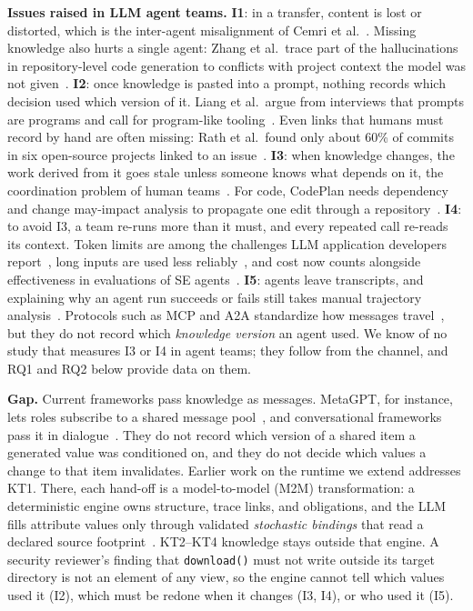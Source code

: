 \documentclass[10pt,conference]{IEEEtran}
\theoremstyle{definition}
\newcommand{\code}[1]{\texttt{#1}}
\begin{document}
\smallskip\noindent\textbf{Issues raised in LLM agent teams.} \textbf{I1}: in a transfer, content is lost
or distorted, which is the inter-agent misalignment of Cemri et al.~\cite{cemri2025mast}. Missing knowledge
also hurts a single agent: Zhang et al.\ trace part of the hallucinations in repository-level code
generation to conflicts with project context the model was not given~\cite{zhang2025hallucination}.
\textbf{I2}: once knowledge is pasted into a prompt, nothing records which decision used which version of
it. Liang et al.\ argue from interviews that prompts are programs and call for program-like
tooling~\cite{liang2025prompts}. Even links that humans must record by hand are often missing: Rath et al.\
found only about 60\% of commits in six open-source projects linked to an issue~\cite{rath2018traceability}.
\textbf{I3}: when knowledge changes, the work derived from it goes stale unless someone knows what depends on
it, the coordination problem of human teams~\cite{desouza2008dependencies,cataldo2013coordination}. For code,
CodePlan needs dependency and change may-impact analysis to propagate one edit through a
repository~\cite{bairi2024codeplan}. \textbf{I4}: to avoid I3, a team re-runs more than it must, and every
repeated call re-reads its context. Token limits are among the challenges LLM application developers
report~\cite{chen2025llmdevchallenges}, long inputs are used less reliably~\cite{liu2024lost}, and cost now
counts alongside effectiveness in evaluations of SE agents~\cite{xia2025agentless}. \textbf{I5}: agents
leave transcripts, and explaining why an agent run succeeds or fails still takes manual trajectory
analysis~\cite{bouzenia2025trajectories}. Protocols such as MCP and A2A standardize how messages
travel~\cite{mcp2024,a2a2025,ehtesham2025interop}, but they do not record which \emph{knowledge version} an
agent used. We know of no study that measures I3 or I4 in agent teams; they follow from the channel, and
RQ1 and RQ2 below provide data on them.

\smallskip\noindent\textbf{Gap.} Current frameworks pass knowledge as messages. MetaGPT, for instance, lets
roles subscribe to a shared message pool~\cite{hong2024metagpt}, and conversational frameworks pass it in
dialogue~\cite{wu2024autogen,qian2024chatdev}. They do not record which version of a shared item a generated
value was conditioned on, and they do not decide which values a change to that item invalidates. Earlier work
on the runtime we extend addresses KT1. There, each hand-off is a model-to-model (M2M) transformation: a
deterministic engine owns structure, trace links, and obligations, and the LLM fills attribute values only
through validated \emph{stochastic bindings} that read a declared source footprint~\cite{anon2027agentm2m}.
KT2--KT4 knowledge stays outside that engine. A security reviewer's finding that \code{download()} must not
write outside its target directory is not an element of any view, so the engine cannot tell which values
used it (I2), which must be redone when it changes (I3, I4), or who used it (I5).
\end{document}
